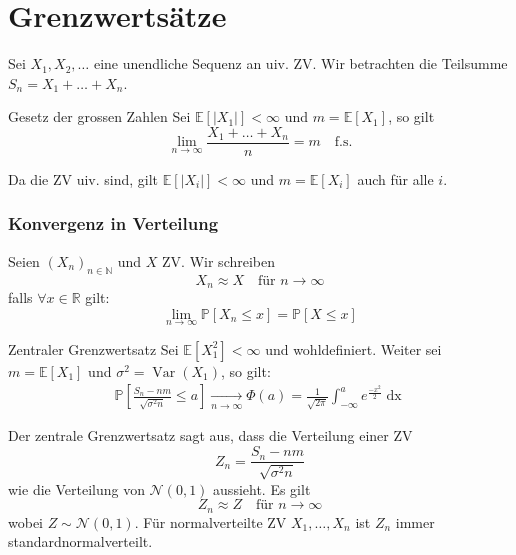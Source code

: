 \documentclass[a4paper,10pt]{article}
\def\R{\mathbb{R}}
\def\P{\mathbb{P}}
\def\E{\mathbb{E}}
\DeclareMathOperator{\Var}{\text{Var}}
\begin{document}
\section{Grenzwertsätze}
Sei \(X_1, X_2, \ldots\) eine unendliche Sequenz an uiv. ZV. Wir betrachten die Teilsumme \(S_n = X_1 + \ldots + X_n\).
\begin{mainbox}{Gesetz der grossen Zahlen}
	Sei \(\E[|X_1|] < \infty\) und \(m = \E[X_1]\), so gilt
	\[\lim_{n\to \infty} \frac{X_1 + \ldots + X_n}{n} = m \quad \text{f.s.}\]
\end{mainbox}
Da die ZV uiv. sind, gilt \(\E[|X_i|] < \infty\) und \(m = \E[X_i]\) auch für alle \(i\).

\subsubsection*{Konvergenz in Verteilung}
Seien \((X_n)_{n\in \mathbb{N}}\) und \(X\) ZV. Wir schreiben
\[X_n \approx X \quad \text{für } n \to \infty\]
falls \(\forall x \in \R\) gilt:
\[\lim_{n\to\infty} \P[X_n \le x] = \P[X \le x ]\]

\begin{mainbox}{Zentraler Grenzwertsatz}
	Sei \(\E[X^2_1] < \infty\) und wohldefiniert. Weiter sei \(m = \E[X_1]\) und \(\sigma^2 = \Var(X_1)\), so gilt:
	\begin{align*}
		\P\left[\frac{S_n - nm}{\sqrt{\sigma^2 n}} \leq a\right] \xrightarrow[n \to \infty]{} \Phi(a) = \frac{1}{\sqrt{2 \pi}} \int_{-\infty}^a e^{\frac{-x^2}{2}} \mathop{dx}
	\end{align*}
\end{mainbox}
Der zentrale Grenzwertsatz sagt aus, dass die Verteilung einer ZV
\[Z_n = \frac{S_n - nm}{\sqrt{\sigma^2 n}}\]
wie die Verteilung von \(\mathcal{N}(0,1)\) aussieht. Es gilt
\[Z_n \approx Z \quad \text{für } n\to \infty\]
wobei \(Z \sim \mathcal{N}(0,1)\). Für normalverteilte ZV \(X_1, \ldots, X_n\) ist \(Z_n\) immer standardnormalverteilt.
\end{document}
